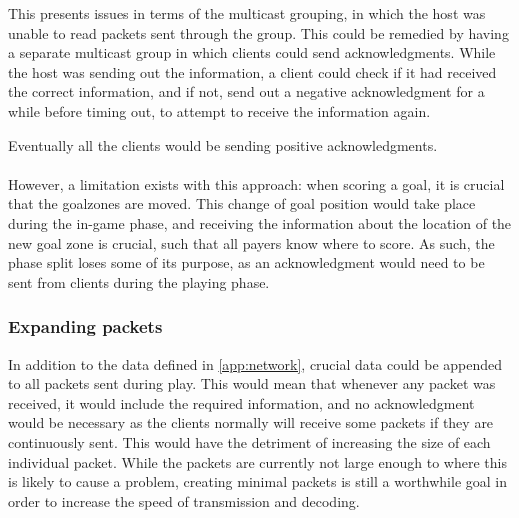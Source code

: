 This presents issues in terms of the multicast grouping, in which the host was unable to read packets sent through the group.
This could be remedied by having a separate multicast group in which clients could send acknowledgments.
While the host was sending out the information, a client could check if it had received the correct information, and if not, send out a negative acknowledgment for a while before timing out, to attempt to receive the information again.

Eventually all the clients would be sending positive acknowledgments.
\\\\
However, a limitation exists with this approach: when scoring a goal, it is crucial that the goalzones are moved.
This change of goal position would take place during the in-game phase, and receiving the information about the location of the new goal zone is crucial, such that all payers know where to score.
As such, the phase split loses some of its purpose, as an acknowledgment would need to be sent from clients during the playing phase.

\subsubsection{Expanding packets}
In addition to the data defined in \autoref{app:network}, crucial data could be appended to all packets sent during play.
This would mean that whenever any packet was received, it would include the required information, and no acknowledgment would be necessary as the clients normally will receive some packets if they are continuously sent.
This would have the detriment of increasing the size of each individual packet.
While the packets are currently not large enough to where this is likely to cause a problem, creating minimal packets is still a worthwhile goal in order to increase the speed of transmission and decoding.


